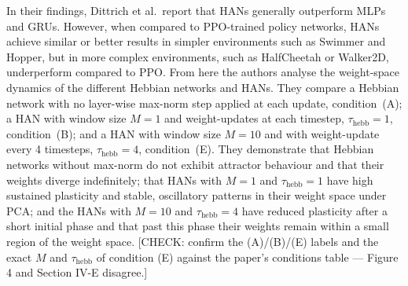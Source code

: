 \documentclass{article} %
\begin{document}
In their findings, Dittrich et al.\ report that HANs generally outperform MLPs and GRUs. However, when compared to PPO-trained policy networks, HANs achieve similar or better results in simpler environments such as Swimmer and Hopper, but in more complex environments, such as HalfCheetah or Walker2D, underperform compared to PPO. From here the authors analyse the weight-space dynamics of the different Hebbian networks and HANs. They compare a Hebbian network with no layer-wise max-norm step applied at each update, condition~(A); a HAN with window size $M = 1$ and weight-updates at each timestep, $\tau_{\mathrm{hebb}} = 1$, condition~(B); and a HAN with window size $M = 10$ and with weight-update every 4 timesteps, $\tau_{\mathrm{hebb}} = 4$, condition~(E). They demonstrate that Hebbian networks without max-norm do not exhibit attractor behaviour and that their weights diverge indefinitely; that HANs with $M = 1$ and $\tau_{\mathrm{hebb}} = 1$ have high sustained plasticity and stable, oscillatory patterns in their weight space under PCA; and the HANs with $M = 10$ and $\tau_{\mathrm{hebb}} = 4$ have reduced plasticity after a short initial phase and that past this phase their weights remain within a small region of the weight space. [CHECK: confirm the (A)/(B)/(E) labels and the exact $M$ and $\tau_{\mathrm{hebb}}$ of condition (E) against the paper's conditions table --- Figure 4 and Section IV-E disagree.]
\end{document}
